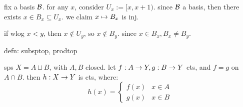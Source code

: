 \begin{pf}[source=Primary Source Material]
    fix a basis $\mathcal{B}$.
    for any $x$, consider $U_{x}:=[x,x+1)$.
    since $\mathcal{B}$ a basis, then there exists $x\in B_{x}\subseteq U_{x}$.
    we claim $x\mapsto B_{x}$ is inj.

    if wlog $x<y$, then $x \notin U_{y}$, so $x \notin B_{y}$.
    since $x\in B_{x}, B_{x}\neq B_{y}$.
\end{pf}

defn: subsptop, prodtop


\vspace{-0.1in}
\begin{prop}[type=Title,title=Pasting Lemma]
    sps $X=A\sqcup B$, with $A,B$ closed.
    let $f:A\rightarrow Y,g:B\rightarrow Y$ cts, and $f=g$ on $A\cap B$.
    then $h:X\rightarrow Y$ is cts, where:
    \begin{equation*}
        h(x)=
        \begin{cases}
            f(x) & x\in A \\
            g(x) & x\in B
        \end{cases}
    \end{equation*}
\end{prop}



